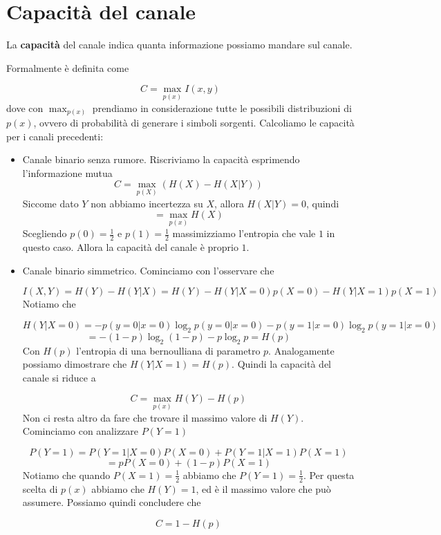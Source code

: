 \documentclass[12pt]{report}
\begin{document}
    \section{Capacità del canale}

    \begin{defi}
        La \textbf{capacità} del canale indica quanta informazione possiamo mandare sul canale.
    \end{defi}

    \noindent
    Formalmente è definita come

    $$C = \max_{p(x)} I(x,y)$$
    dove con $\max_{p(x)}$ prendiamo in considerazione tutte le possibili distribuzioni di $p(x)$, ovvero di probabilità di generare i simboli sorgenti. Calcoliamo le capacità per i canali precedenti:

    \begin{itemize}
        \item Canale binario senza rumore. Riscriviamo la capacità esprimendo l'informazione mutua
        $$C = \max_{p(X)} (H(X) - H(X|Y))$$
        Siccome dato $Y$ non abbiamo incertezza su $X$, allora $H(X|Y) = 0$, quindi
        $$= \max_{p(x)} H(X)$$
        Scegliendo $p(0) = \frac{1}{2}$ e $p(1) = \frac{1}{2}$ massimizziamo l'entropia che vale $1$ in questo caso. Allora la capacità del canale è proprio $1$.
        \item Canale binario simmetrico. Cominciamo con l'osservare che

        $$I(X,Y) = H(Y) - H(Y|X) = H(Y) - H(Y | X = 0) p(X = 0) - H(Y | X = 1) p(X = 1)$$
        Notiamo che

        $$H(Y|X = 0) = - p(y=0|x = 0)\log_2{p(y=0|x = 0)} -  p(y=1|x = 0)\log_2{p(y=1|x = 0)}$$
        $$= - (1-p) \log_2{(1-p)} - p\log_2{p} = H(p)$$
        Con $H(p)$ l'entropia di una bernoulliana di parametro $p$. Analogamente possiamo dimostrare che  $H(Y|X = 1) = H(p)$. Quindi la capacità del canale si riduce a

        $$C = \max_{p(x)} H(Y) - H(p)$$
        Non ci resta altro da fare che trovare il massimo valore di $H(Y)$. Cominciamo con analizzare $P(Y = 1)$

        $$P(Y = 1) = P(Y=1 | X = 0) P(X = 0) + P(Y=1 | X = 1) P(X = 1)$$
        $$= p P(X = 0) + (1-p) P(X = 1)$$
        Notiamo che  quando $P(X=1) = \frac{1}{2}$ abbiamo che $P(Y=1) = \frac{1}{2}$. Per questa scelta di $p(x)$ abbiamo che $H(Y) = 1$, ed è il massimo valore che può assumere. Possiamo quindi concludere che

        $$C =  1 - H(p)$$
    \end{itemize}
\end{document}

